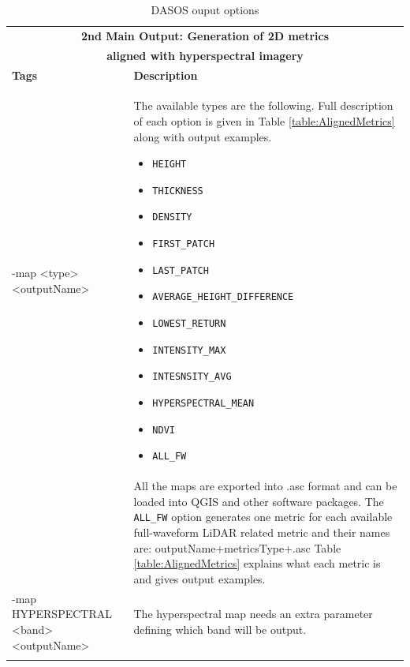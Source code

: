 \documentclass{article}
\begin{document}
			\begin{longtable}	 	
		 	{|p{3.1cm}|p{11cm}|}
	 			\toprule
	 			\multicolumn{2}{|c|}{\textbf{2nd Main Output: Generation of 2D metrics}} \\
	 			\multicolumn{2}{|c|}{\textbf{aligned with hyperspectral imagery }} \\
	 			\midrule
	 			\textbf{Tags}  & \textbf{Description}  \\
	 			
	 			\midrule
	 			-map <type>\newline <outputName>    & The available types are the following. Full description of each option is given in Table \ref{table:AlignedMetrics} along with output examples. 
	 			\begin{itemize}[noitemsep]
	 				\item \verb|HEIGHT|
	 				\item \verb|THICKNESS|
	 				\item \verb|DENSITY |
	 				\item \verb|FIRST_PATCH|
	 				\item \verb|LAST_PATCH|
	 				\item \verb|AVERAGE_HEIGHT_DIFFERENCE|
	 				\item \verb|LOWEST_RETURN|
	 				\item \verb|INTENSITY_MAX|
	 				\item \verb|INTESNSITY_AVG|
	 				\item \verb|HYPERSPECTRAL_MEAN|
	 				\item \verb|NDVI|
	 				\item \verb|ALL_FW| 
	 			\end{itemize} \\
	 			&  All the maps are exported into .asc format and can be loaded into QGIS and other software packages. The \verb|ALL_FW| option generates one metric for each available full-waveform LiDAR related metric and their names are: outputName+metricsType+.asc \newline
	 			Table \ref{table:AlignedMetrics} explains what each metric is and gives output examples.\\
	 			\cmidrule(r){1-1}\cmidrule(l){2-2}
	 			-map \newline HYPERSPECTRAL \newline <band>\newline <outputName> & The hyperspectral map needs an extra parameter defining which band will be output. \\
	 			
	 			
	 			\bottomrule
	 		\caption{DASOS ouput options}
	 		\label{table:outputs}
	 	\end{longtable}
	 	
\end{document}
